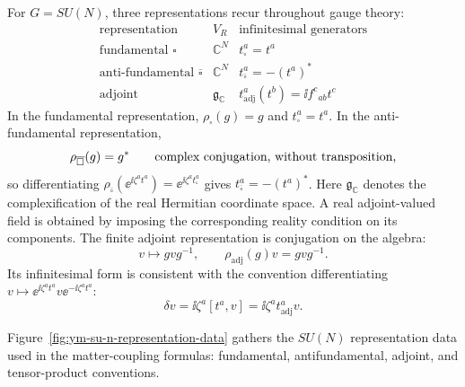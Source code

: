 For \(G=SU(N)\), three representations recur throughout gauge theory:
\[
\begin{array}{c|c|c}
\text{representation} & V_R & \text{infinitesimal generators} \\ \hline
\text{fundamental } \square & \mathbb C^N & t_\square^a=t^a \\
\text{anti-fundamental } \overline{\square} & \mathbb C^N &
  t_{\overline{\square}}^a=-(t^a)^* \\
\text{adjoint} & \mathfrak g_{\mathbb C} &
  t_{\mathrm{adj}}^a(t^b)=\ii f^c{}_{ab}t^c
\end{array}
\]
In the fundamental representation,
\(\rho_{\square}(g)=g\) and \(t_{\square}^a=t^a\).  In the
anti-fundamental representation,
\[
  \rho_{\overline{\square}}(g)=g^*
  \qquad\hbox{complex conjugation, without transposition,}
\]
so differentiating
\(\rho_{\overline{\square}}(\ee^{\ii\zeta^a t^a})
=\ee^{\ii\zeta^a t_{\overline{\square}}^a}\) gives
\(t_{\overline{\square}}^a=-(t^a)^*\).
Here \(\mathfrak g_{\mathbb C}\) denotes the complexification of the real
Hermitian coordinate space.  A real adjoint-valued field is obtained by
imposing the corresponding reality condition on its components.  The finite
adjoint representation is conjugation on the algebra:
\[
  v\mapsto gvg^{-1},
  \qquad
  \rho_{\mathrm{adj}}(g)v=gvg^{-1}.
\]
Its infinitesimal form is consistent with the convention
differentiating \(v\mapsto \ee^{\ii\zeta^a t^a}v\ee^{-\ii\zeta^a t^a}\):
\[
  \delta v
  =
  \ii\zeta^a[t^a,v]
  =
  \ii\zeta^a t_{\mathrm{adj}}^a v .
\]

Figure~\ref{fig:ym-su-n-representation-data} gathers the \(SU(N)\)
representation data used in the matter-coupling formulas: fundamental,
antifundamental, adjoint, and tensor-product conventions.

